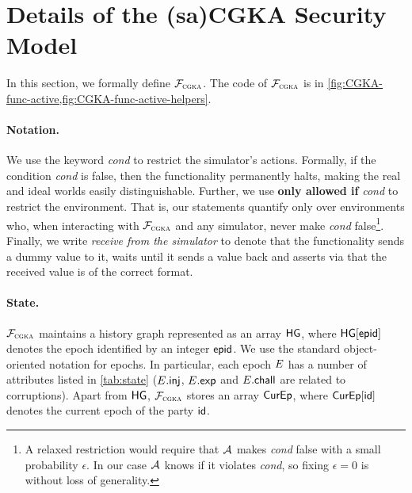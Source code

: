 
\section{Details of the (sa)CGKA Security Model}\label{sec:model}
In this section, we formally define $\mathcal{F}_{\normalfont\textsc{cgka}}$. The code of $\mathcal{F}_{\normalfont\textsc{cgka}}$ is in \cref{fig:CGKA-func-active,fig:CGKA-func-active-helpers}.

%
\paragraph{Notation.}
We use the keyword \KwAss{} \textit{cond} to restrict the simulator's actions. Formally, if the condition \textit{cond}
is false, then the functionality permanently halts, making the real and ideal worlds easily distinguishable. Further, we
use {\bf only allowed if} \textit{cond} to restrict the environment. That is, our statements quantify only over
environments who, when interacting with $\mathcal{F}_{\normalfont\textsc{cgka}}$ and any simulator, never make \textit{cond} false\footnote{A relaxed
  restriction would require that $\mathcal{A}_{\relax}$ makes \textit{cond} false with a small probability $\epsilon$. In our case
  $\mathcal{A}_{\relax}$ knows if it violates \textit{cond}, so fixing $\epsilon=0$ is without loss of generality.}.
Finally, we write \emph{receive from the simulator} to denote that the functionality sends a dummy value to it, waits until it sends a value back and asserts via \KwAss{} that the received value is of the correct format.

\paragraph{State.}
$\mathcal{F}_{\normalfont\textsc{cgka}}$ maintains a history graph represented as an array $\mathsf{HG}$, where $\mathsf{HG}[{\normalfont\textsf{epid}}]$ denotes the epoch identified by an integer ${\normalfont\textsf{epid}}$. We use the standard object-oriented notation for epochs. In particular, each epoch $E$ has a number of attributes listed in \cref{tab:state} ($E.\textsf{inj}$, $E.\mathsf{exp}$ and $E.\mathsf{chall}$ are related to corruptions).
 Apart from $\mathsf{HG}$, $\mathcal{F}_{\normalfont\textsc{cgka}}$ stores an array $\textsf{CurEp}$, where $\textsf{CurEp}[{\mathsf{id}}]$ denotes the current epoch of the party ${\mathsf{id}}$.

